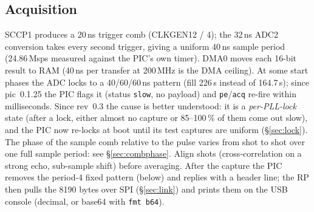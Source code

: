 \documentclass[10pt,a4paper]{article}
\newcommand{\us}{\,\textmu s}
\newcommand{\cmd}[1]{\texttt{#1}}
\begin{document}
\subsection{Acquisition}
SCCP1 produces a 20\,ns trigger comb (CLKGEN12 / 4); the 32\,ns ADC2 conversion takes every second trigger, giving a uniform
40\,ns sample period (24.86\,Msps measured against the PIC's own timer). DMA0 moves each 16-bit result to RAM (40\,ns per transfer at
200\,MHz is the DMA ceiling). At some start phases the ADC locks to a 40/60/60\,ns pattern (fill 226\us{} instead of 164.7\us);
since pic~0.1.25 the PIC flags it (status \cmd{slow}, no payload) and \cmd{pe}/\cmd{acq} re-fire within milliseconds. Since rev~0.3
the cause is better understood: it is a \emph{per-PLL-lock} state (after a lock, either almost no capture or 85–100\,\% of them come
out slow), and the PIC now re-locks at boot until its test captures are uniform (\S\ref{sec:lock}).
The phase of the sample comb relative to the pulse varies from shot to shot over one full sample period: see
\S\ref{sec:combphase}. Align shots (cross-correlation on a strong echo, sub-sample shift) before averaging.
After the capture the PIC removes the period-4 fixed pattern (below) and replies with a header line; the RP then pulls the
8190 bytes over SPI (\S\ref{sec:link}) and prints them on the USB console (decimal, or base64 with \cmd{fmt b64}).
\end{document}

